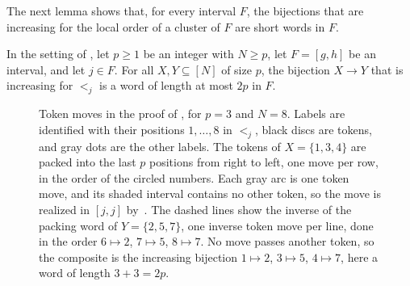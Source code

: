 \documentclass[fontsize=12pt,leading=14pt]{fullpaper}
\begin{document}
The next lemma shows that, for every interval $F$, the bijections that are increasing for the local order of a cluster of $F$ are short words in $F$.

\begin{lemma}\label{lem:s3-normalization}
  In the setting of , let $p\ge1$ be an integer with $N\ge p$, let $F=[g,h]$ be an interval, and let $j\in F$.
  For all $X,Y\subseteq[N]$ of size $p$, the bijection $X\to Y$ that is increasing for $<_j$ is a word of length at most $2p$ in $F$.
\end{lemma}

\begin{figure}[ht]
  \centering
  \caption{Token moves in the proof of , for $p=3$ and $N=8$.
    Labels are identified with their positions $1,\dots,8$ in $<_j$, black discs are tokens, and gray dots are the other labels.
    The tokens of $X=\{1,3,4\}$ are packed into the last $p$ positions from right to left, one move per row, in the order of the circled numbers.
    Each gray arc is one token move, and its shaded interval contains no other token, so the move is realized in $[j,j]$ by~.
    The dashed lines show the inverse of the packing word of $Y=\{2,5,7\}$, one inverse token move per line, done in the order $6\mapsto2$, $7\mapsto5$, $8\mapsto7$.
  No move passes another token, so the composite is the increasing bijection $1\mapsto2$, $3\mapsto5$, $4\mapsto7$, here a word of length $3+3=2p$.}
  \label{fig:s3-tokens}
\end{figure}
\end{document}
